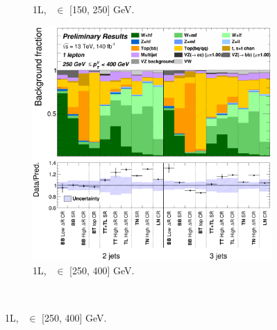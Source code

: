 \begin{figure}[h!]
{\begin{subfigure}[b]{0.37\textwidth}
            \caption{1L, \ptv\ $\in$ [150, 250] GeV.}
            \label{fig:backCom_1L_2}
        \end{subfigure}
        \begin{subfigure}[b]{0.37\textwidth}
        \centering
        \includegraphics[width=\textwidth]{Images/VH/Own_fit/backCom_uncPrefit/GlobalFit_unconditional__Prefit/C_SRCRs_L1_BMax400_BMin250.png}
        \caption{1L, \ptv\ $\in$ [250, 400] GeV.}
        \label{fig:backCom_1L_3}
        \end{subfigure} 
    }   \\
\end{figure}
